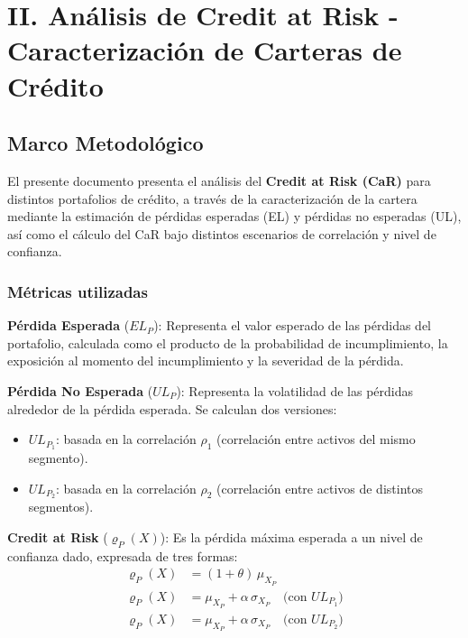 
\section{II. Análisis de Credit at Risk - Caracterización de Carteras de Crédito}

\subsection{Marco Metodológico}

El presente documento presenta el análisis del \textbf{Credit at Risk (CaR)} para distintos portafolios de crédito, a través de la caracterización de la cartera mediante la estimación de pérdidas esperadas (EL) y pérdidas no esperadas (UL), así como el cálculo del CaR bajo distintos escenarios de correlación y nivel de confianza.

\subsubsection{Métricas utilizadas}

\textbf{Pérdida Esperada} ($EL_P$): Representa el valor esperado de las pérdidas del portafolio, calculada como el producto de la probabilidad de incumplimiento, la exposición al momento del incumplimiento y la severidad de la pérdida.

\textbf{Pérdida No Esperada} ($UL_P$): Representa la volatilidad de las pérdidas alrededor de la pérdida esperada. Se calculan dos versiones:
\begin{itemize}
  \item $UL_{P_1}$: basada en la correlación $\rho_1$ (correlación entre activos del mismo segmento).
  \item $UL_{P_2}$: basada en la correlación $\rho_2$ (correlación entre activos de distintos segmentos).
\end{itemize}

\textbf{Credit at Risk} ($\varrho_P(X)$): Es la pérdida máxima esperada a un nivel de confianza dado, expresada de tres formas:
\begin{align*}
  \varrho_P(X) &= (1+\theta)\,\mu_{X_P} \\
  \varrho_P(X) &= \mu_{X_P} + \alpha\,\sigma_{X_P} \quad \text{(con } UL_{P_1}\text{)} \\
  \varrho_P(X) &= \mu_{X_P} + \alpha\,\sigma_{X_P} \quad \text{(con } UL_{P_2}\text{)}
\end{align*}

